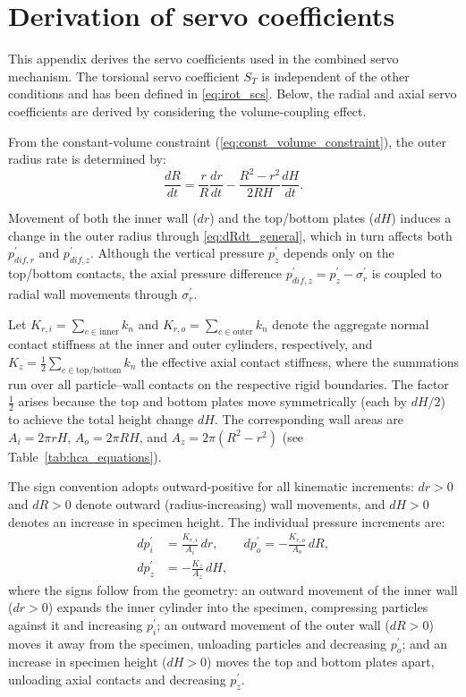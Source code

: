 \documentclass[a4paper,fleqn]{cas-sc}
\begin{document}
\section{Derivation of servo coefficients}
\label{sec:appendix_servo}

This appendix derives the servo coefficients used in the combined servo mechanism. The torsional servo coefficient $S_T$ is independent of the other conditions and has been defined in \cref{eq:irot_scs}. Below, the radial and axial servo coefficients are derived by considering the volume-coupling effect.

From the constant-volume constraint (\cref{eq:const_volume_constraint}), the outer radius rate is determined by:
\begin{equation}
\frac{dR}{dt} = \frac{r}{R}\frac{dr}{dt} - \frac{R^2-r^2}{2RH}\frac{dH}{dt}.
\label{eq:dRdt_general}
\end{equation}

Movement of both the inner wall ($dr$) and the top/bottom plates ($dH$) induces a change in the outer radius through \cref{eq:dRdt_general}, which in turn affects both $p_{dif,r}^{\prime}$ and $p_{dif,z}^{\prime}$. Although the vertical pressure $p_z^{\prime}$ depends only on the top/bottom contacts, the axial pressure difference $p_{dif,z}^{\prime}=p_z^{\prime}-\sigma_r^{\prime}$ is coupled to radial wall movements through $\sigma_r^{\prime}$.

Let $K_{r,i}=\sum_{c\in\mathrm{inner}} k_n$ and $K_{r,o}=\sum_{c\in\mathrm{outer}} k_n$ denote the aggregate normal contact stiffness at the inner and outer cylinders, respectively, and $K_z=\frac{1}{2}\sum_{c\in\mathrm{top/bottom}} k_n$ the effective axial contact stiffness, where the summations run over all particle--wall contacts on the respective rigid boundaries. The factor $\frac{1}{2}$ arises because the top and bottom plates move symmetrically (each by $dH/2$) to achieve the total height change $dH$. The corresponding wall areas are $A_i=2\pi rH$, $A_o=2\pi RH$, and $A_z=2\pi(R^2-r^2)$ (see Table~\ref{tab:hca_equations}).

The sign convention adopts outward-positive for all kinematic increments: $dr>0$ and $dR>0$ denote outward (radius-increasing) wall movements, and $dH>0$ denotes an increase in specimen height. The individual pressure increments are:
\begin{align}
dp_i^{\prime} &= \frac{K_{r,i}}{A_i}\,dr,\qquad
dp_o^{\prime} = -\frac{K_{r,o}}{A_o}\,dR, \label{eq:dp_individual_r}\\[4pt]
dp_z^{\prime} &= -\frac{K_z}{A_z}\,dH, \label{eq:dp_individual_z}
\end{align}
where the signs follow from the geometry: an outward movement of the inner wall ($dr>0$) expands the inner cylinder into the specimen, compressing particles against it and increasing $p_i^{\prime}$; an outward movement of the outer wall ($dR>0$) moves it away from the specimen, unloading particles and decreasing $p_o^{\prime}$; and an increase in specimen height ($dH>0$) moves the top and bottom plates apart, unloading axial contacts and decreasing $p_z^{\prime}$.
\end{document}
